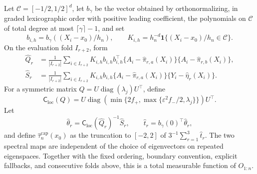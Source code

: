 Let \(\mathcal C=[-1/2,1/2]^d\), let \(b_\gamma\) be the vector obtained by
orthonormalizing, in graded lexicographic order with positive leading
coefficient, the polynomials on \(\mathcal C\) of total degree at most
\(\lceil\gamma\rceil-1\), and set
\[
b_{i,h}=b_\gamma((X_i-x_0)/h_n),\qquad
K_{i,h}=h_n^{-d}\mathbf1\{(X_i-x_0)/h_n\in\mathcal C\}.
\]
On the evaluation fold \(I_{r+2}\), form
\[
\begin{aligned}
\widehat Q_r&=\frac1{|I_{r+2}|}\sum_{i\in I_{r+2}}
K_{i,h}b_{i,h}b_{i,h}^\top
\{A_i-\widehat\pi_{r,a}(X_i)\}
\{A_i-\widehat\pi_{r,b}(X_i)\},\\
\widehat S_r&=\frac1{|I_{r+2}|}\sum_{i\in I_{r+2}}
K_{i,h}b_{i,h}
\{A_i-\widehat\pi_{r,a}(X_i)\}
\{Y_i-\widehat\eta_r(X_i)\}.
\end{aligned}
\]
For a symmetric matrix \(Q=U\operatorname{diag}(\lambda_j)U^\top\), define
\[
\mathsf C_{\mathrm{loc}}(Q)=U\operatorname{diag}\!\left(
\min\{2f_+,\max\{\varepsilon^2f_-/2,\lambda_j\}\}
\right)U^\top.
\]
Let
\[
\widehat\theta_r=\mathsf C_{\mathrm{loc}}(\widehat Q_r)^{-1}
\widehat S_r,
\qquad
\widehat t_r=b_\gamma(0)^\top\widehat\theta_r,
\]
and define \(\widehat\tau_n^{\mathrm{cap}}(x_0)\) as the truncation to
\([-2,2]\) of \(3^{-1}\sum_{r=1}^3\widehat t_r\).  The two spectral maps
are independent of the choice of eigenvectors on repeated eigenspaces.
Together with the fixed ordering, boundary convention, explicit fallbacks,
and consecutive folds above, this is a total measurable function of
\(O_{1:n}\).